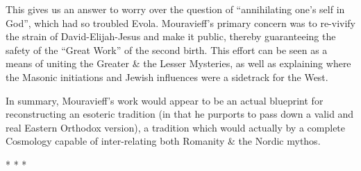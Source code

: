 This gives us an answer to worry over the question of ``annihilating one's self in God'', which had so troubled Evola. Mouravieff's primary concern was to re-vivify the strain of David-Elijah-Jesus and make it public, thereby guaranteeing the safety of the ``Great Work'' of the second birth. This effort can be seen as a means of uniting the Greater \& the Lesser Mysteries, as well as explaining where the Masonic initiations and Jewish influences were a sidetrack for the West.

In summary, Mouravieff's work would appear to be an actual blueprint for reconstructing an esoteric tradition (in that he purports to pass down a valid and real Eastern Orthodox version), a tradition which would actually by a complete Cosmology capable of inter-relating both Romanity
\& the Nordic mythos.




\begin{center}* * *\end{center}

